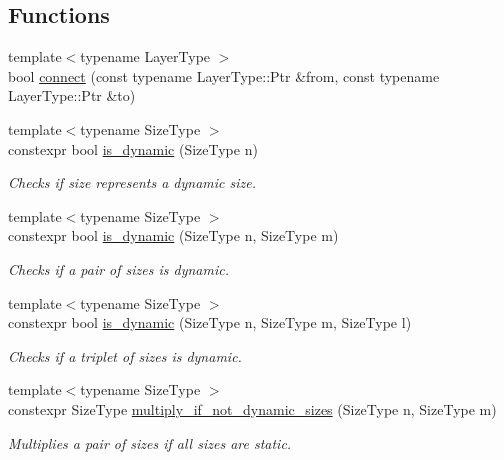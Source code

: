 \subsection*{Functions}
\begin{DoxyCompactItemize}
\item 
{\footnotesize template$<$typename Layer\-Type $>$ }\\bool \hyperlink{namespaceffnn_1_1layer_a33fc9c6c7eb5fbdef14e0aa0db97dd13}{connect} (const typename Layer\-Type\-::\-Ptr \&from, const typename Layer\-Type\-::\-Ptr \&to)
\item 
{\footnotesize template$<$typename Size\-Type $>$ }\\constexpr bool \hyperlink{namespaceffnn_1_1layer_a83ba223c7b7eb8e3d926b98b266f24c8}{is\-\_\-dynamic} (Size\-Type n)
\begin{DoxyCompactList}\small\item\em Checks if size represents a dynamic size. \end{DoxyCompactList}\item 
{\footnotesize template$<$typename Size\-Type $>$ }\\constexpr bool \hyperlink{namespaceffnn_1_1layer_a9369bd9ca711c303dd6709fbb50ef169}{is\-\_\-dynamic} (Size\-Type n, Size\-Type m)
\begin{DoxyCompactList}\small\item\em Checks if a pair of sizes is dynamic. \end{DoxyCompactList}\item 
{\footnotesize template$<$typename Size\-Type $>$ }\\constexpr bool \hyperlink{namespaceffnn_1_1layer_a6a3ca00311f112957ed5ca16b5b3acdd}{is\-\_\-dynamic} (Size\-Type n, Size\-Type m, Size\-Type l)
\begin{DoxyCompactList}\small\item\em Checks if a triplet of sizes is dynamic. \end{DoxyCompactList}\item 
{\footnotesize template$<$typename Size\-Type $>$ }\\constexpr Size\-Type \hyperlink{namespaceffnn_1_1layer_a311eb389a31756b22de7d4ca5b64b575}{multiply\-\_\-if\-\_\-not\-\_\-dynamic\-\_\-sizes} (Size\-Type n, Size\-Type m)
\begin{DoxyCompactList}\small\item\em Multiplies a pair of sizes if all sizes are static. \end{DoxyCompactList}\item 

\end{DoxyCompactItemize}
